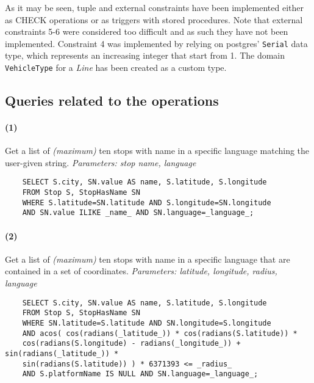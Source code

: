 	As it may be seen, tuple and external constraints have been implemented either as CHECK operations or as triggers with stored procedures. Note that external constraints 5-6 were considered too difficult and as such they have not been implemented. Constraint 4 was implemented by relying on postgres' \texttt{Serial} data type, which represents an increasing integer that start from 1. The domain \texttt{VehicleType} for a \textit{Line} has been created as a custom type.

\subsection{Queries related to the operations}

	\paragraph{(1)} Get a list of \textit{(maximum)} ten stops with name in a specific language matching the user-given string. \textit{Parameters: stop name, language}
	\begin{center}
		\begin{lstlisting}
	SELECT S.city, SN.value AS name, S.latitude, S.longitude
	FROM Stop S, StopHasName SN
	WHERE S.latitude=SN.latitude AND S.longitude=SN.longitude
	AND SN.value ILIKE _name_ AND SN.language=_language_;
		\end{lstlisting}
	\end{center}

	\paragraph{(2)} Get a list of \textit{(maximum)} ten stops with name in a specific language that are contained in a set of coordinates. \textit{Parameters: latitude, longitude, radius, language}
	\begin{center}
	\begin{lstlisting}
	SELECT S.city, SN.value AS name, S.latitude, S.longitude
	FROM Stop S, StopHasName SN
	WHERE SN.latitude=S.latitude AND SN.longitude=S.longitude
	AND acos( cos(radians(_latitude_)) * cos(radians(S.latitude)) *
	cos(radians(S.longitude) - radians(_longitude_)) + sin(radians(_latitude_)) *
	sin(radians(S.latitude)) ) * 6371393 <= _radius_
	AND S.platformName IS NULL AND SN.language=_language_;
	\end{lstlisting}
\end{center}

	\newpage
